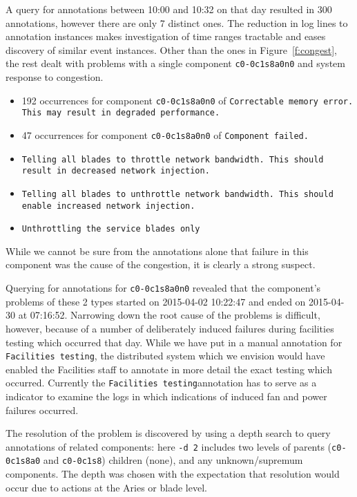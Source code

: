 A query for annotations between 10:00 and 10:32 on that day resulted in 300 annotations, however there are only 7 distinct ones.
The reduction in log lines to annotation instances makes investigation of time ranges tractable and eases discovery
of similar event instances. Other than the ones in Figure~\ref{f:congest}, the rest dealt with problems with a single component \texttt{c0-0c1s8a0n0} and system
response to congestion.
\begin{itemize}
\item  192 occurrences for component \texttt{c0-0c1s8a0n0} of \scriptsize\texttt{Correctable memory error.  This may result in degraded performance.}\normalsize
\item  47 occurrences for component \texttt{c0-0c1s8a0n0} of \scriptsize\texttt{Component failed.}\normalsize
\item \scriptsize\texttt{Telling all blades to throttle network bandwidth. This should result in decreased network injection.}\normalsize
\item \scriptsize\texttt{Telling all blades to unthrottle network bandwidth. This should enable increased network injection.}\normalsize
\item \scriptsize\texttt{Unthrottling the service blades only}\normalsize
\end{itemize}


While we cannot be sure from the annotations alone that failure in this component was the cause of the congestion, it
is clearly a strong suspect.

Querying for annotations for \texttt{c0-0c1s8a0n0} revealed that the component's problems of these 2 types
started on 2015-04-02 10:22:47 and ended on 2015-04-30 at 07:16:52.
Narrowing down the root cause of the problems is difficult, however, because of a number of deliberately induced failures
during facilities testing which occurred that day. While we have put in a manual annotation for \scriptsize\texttt{Facilities testing}\normalsize,
the distributed system which we envision would have enabled the Facilities staff to annotate in more detail the exact testing which occurred.
Currently the \scriptsize\texttt{Facilities testing}\normalsize annotation has to serve as a indicator to examine the logs in which
indications of induced fan and power failures occurred.

The resolution of the problem is discovered by using a depth search to query annotations of related components: here \texttt{-d 2}
includes two levels of parents (\texttt{c0-0c1s8a0} and \texttt{c0-0c1s8}) children (none), and any unknown/supremum components.
The depth was chosen with the expectation that resolution would occur due to actions at the Aries or blade level.

